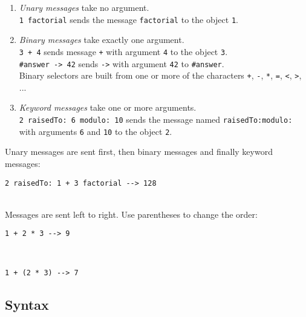 \documentclass[8pt,a4paper]{leaflet}
\newcommand{\ct}{\lstinline[mathescape=false,basicstyle={\sffamily\upshape}]}
\begin{document}
\begin{enumerate}
	\item \emph{Unary messages} take no argument. \\
	\ct{1 factorial} sends the message \ct{factorial} to the object \ct{1}.	
	\item \emph{Binary messages} take exactly one argument.\\
	\ct{3 + 4} sends message \ct{+} with argument \ct{4} to the object \mbox{\ct{3}.} \\
	\ct{#answer -> 42} sends \ct{->} with argument \ct{42} to \ct{#answer}.\\
	Binary selectors are built from one or more of the characters \ct{+}, \ct{-}, \ct{*}, \ct{=}, \ct{<}, \ct{>}, ...
	
	\item \emph{Keyword messages} take one or more arguments. \\
	\ct{2 raisedTo: 6 modulo: 10} sends the message named \ct{raisedTo:modulo:} with arguments \ct{6} and \ct{10} to the object \ct{2}. 
\end{enumerate}

Unary messages are sent first, then binary messages and finally keyword messages:\\
\centerline{\ct{2 raisedTo: 1 + 3 factorial --> 128}}\\
Messages are sent left to right. Use parentheses to change the order:\\
\centerline{\ct{1 + 2 * 3 --> 9}}\\
\centerline{\ct{1 + (2 * 3) --> 7}}

\subsection{Syntax}
\end{document}
